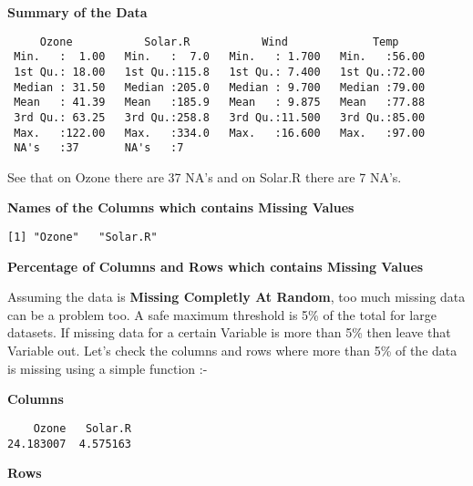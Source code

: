 \documentclass[12pt,]{article}
\begin{document}
\textbf{Summary of the Data}

\begin{verbatim}
     Ozone           Solar.R           Wind             Temp      
 Min.   :  1.00   Min.   :  7.0   Min.   : 1.700   Min.   :56.00  
 1st Qu.: 18.00   1st Qu.:115.8   1st Qu.: 7.400   1st Qu.:72.00  
 Median : 31.50   Median :205.0   Median : 9.700   Median :79.00  
 Mean   : 41.39   Mean   :185.9   Mean   : 9.875   Mean   :77.88  
 3rd Qu.: 63.25   3rd Qu.:258.8   3rd Qu.:11.500   3rd Qu.:85.00  
 Max.   :122.00   Max.   :334.0   Max.   :16.600   Max.   :97.00  
 NA's   :37       NA's   :7                                       
\end{verbatim}

See that on Ozone there are 37 NA's and on Solar.R there are 7 NA's.

\textbf{Names of the Columns which contains Missing Values}

\begin{verbatim}
[1] "Ozone"   "Solar.R"
\end{verbatim}

\textbf{Percentage of Columns and Rows which contains Missing Values}

Assuming the data is \textbf{Missing Completly At Random}, too much
missing data can be a problem too. A safe maximum threshold is 5\% of
the total for large datasets. If missing data for a certain Variable is
more than 5\% then leave that Variable out. Let's check the columns and
rows where more than 5\% of the data is missing using a simple function
:-

\textbf{Columns}

\begin{verbatim}
    Ozone   Solar.R 
24.183007  4.575163 
\end{verbatim}

\textbf{Rows}
\end{document}
